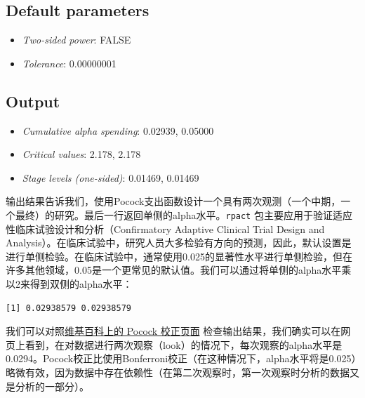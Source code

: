 \documentclass[
  letterpaper,
  DIV=11,
  numbers=noendperiod]{scrreprt}
\newenvironment{Shaded}{\begin{snugshade}}{\end{snugshade}}
\newcommand{\DecValTok}[1]{\textcolor[rgb]{0.68,0.00,0.00}{#1}}
\newcommand{\NormalTok}[1]{\textcolor[rgb]{0.00,0.23,0.31}{#1}}
\newcommand{\SpecialCharTok}[1]{\textcolor[rgb]{0.37,0.37,0.37}{#1}}
\providecommand{\tightlist}{%
  \setlength{\itemsep}{0pt}\setlength{\parskip}{0pt}}\usepackage{longtable,booktabs,array}
\begin{document}
\hypertarget{default-parameters}{%
\subsection{Default parameters}\label{default-parameters}}

\begin{itemize}
\tightlist
\item
  \emph{Two-sided power}: FALSE
\item
  \emph{Tolerance}: 0.00000001
\end{itemize}

\hypertarget{output}{%
\subsection{Output}\label{output}}

\begin{itemize}
\tightlist
\item
  \emph{Cumulative alpha spending}: 0.02939, 0.05000
\item
  \emph{Critical values}: 2.178, 2.178
\item
  \emph{Stage levels (one-sided)}: 0.01469, 0.01469
\end{itemize}

输出结果告诉我们，使用Pocock支出函数设计一个具有两次观测（一个中期，一个最终）的研究。最后一行返回单侧的alpha水平。\texttt{rpact}
包主要应用于验证适应性临床试验设计和分析（Confirmatory Adaptive Clinical
Trial Design and
Analysis）。在临床试验中，研究人员大多检验有方向的预测，因此，默认设置是进行单侧检验。在临床试验中，通常使用0.025的显著性水平进行单侧检验，但在许多其他领域，0.05是一个更常见的默认值。我们可以通过将单侧的alpha水平乘以2来得到双侧的alpha水平：

\begin{Shaded}
\end{Shaded}

\begin{verbatim}
[1] 0.02938579 0.02938579
\end{verbatim}

我们可以对照\href{https://en.wikipedia.org/wiki/Pocock_boundary}{维基百科上的
Pocock 校正页面}
检查输出结果，我们确实可以在网页上看到，在对数据进行两次观察（look）的情况下，每次观察的alpha水平是0.0294。Pocock校正比使用Bonferroni校正（在这种情况下，alpha水平将是0.025）略微有效，因为数据中存在依赖性（在第二次观察时，第一次观察时分析的数据又是分析的一部分）。
\end{document}
